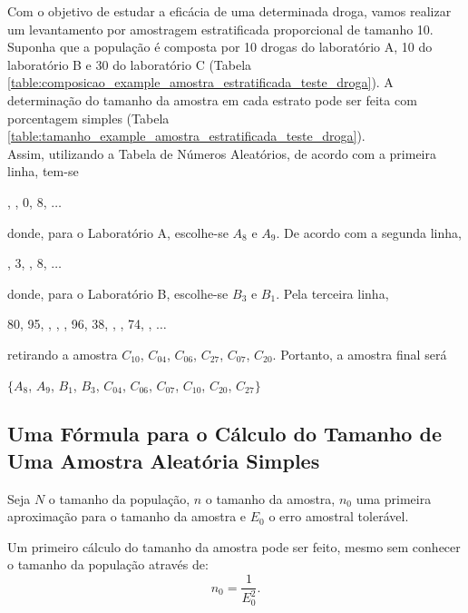 \documentclass[11pt,fleqn]{book}
\numberwithin{mpicture}{chapter}
\numberwithin{mtable}{chapter}
\numberwithin{mframe}{chapter}
\begin{document}
\begin{example}
	\label{example:amostra_estratificada_teste_droga}
	Com o objetivo de estudar a eficácia de uma determinada droga, vamos realizar um levantamento por amostragem estratificada proporcional de tamanho 10. Suponha que a população é composta por 10 drogas do laboratório A, 10 do laboratório B e 30 do laboratório C (Tabela \ref{table:composicao_example_amostra_estratificada_teste_droga}). A determinação do tamanho da amostra em cada estrato pode ser feita com porcentagem simples (Tabela \ref{table:tamanho_example_amostra_estratificada_teste_droga}). \\
	
	Assim, utilizando a Tabela de Números Aleatórios, de acordo com a primeira linha, tem-se
	\begin{center}
		, , 0, 8, $\dots$
	\end{center}
	donde, para o Laboratório A, escolhe-se $A_8$ e $A_9$. De acordo com a segunda linha,
	\begin{center}
		, 3, , 8, $\dots$
	\end{center}
	donde, para o Laboratório B, escolhe-se $B_3$ e $B_1$. Pela terceira linha,
	\begin{center}
		80, 95, , , , 96, 38, , , 74, , $\dots$
	\end{center}
	retirando a amostra $C_{10}$, $C_{04}$, $C_{06}$, $C_{27}$, $C_{07}$, $C_{20}$. Portanto, a amostra final será
	\begin{center}
		$\{A_8$, $A_9$, $B_1$, $B_3$, $C_{04}$, $C_{06}$, $C_{07}$, $C_{10}$, $C_{20}$, $C_{27}\}$
	\end{center}
\end{example}

\subsection{Uma Fórmula para o Cálculo do Tamanho de Uma Amostra Aleatória Simples}

Seja $N$ o tamanho da população, $n$ o tamanho da amostra, $n_0$ uma primeira aproximação para o tamanho da amostra e $E_0$ o erro amostral tolerável.

Um primeiro cálculo do tamanho da amostra pode ser feito, mesmo sem conhecer o tamanho da população através de:
\begin{equation}
	n_0=\frac{1}{E_0^2}\text{.}
\end{equation}
\end{document}
